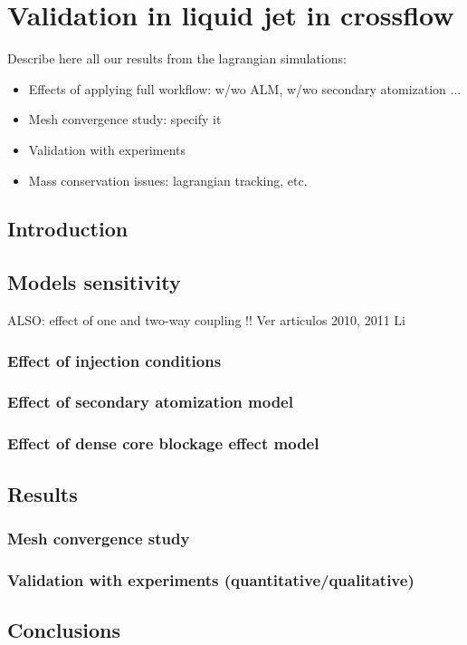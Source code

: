 \chapter{Validation in liquid jet in crossflow}
	\label{ch:jicf_lgs_simulations}


Describe here all our results from the lagrangian simulations:

\begin{itemize}

	\item Effects of applying full workflow: w/wo ALM, w/wo secondary atomization ...
	
	\item Mesh convergence study: specify it
	
	\item Validation with experiments
	
	\item Mass conservation issues: lagrangian tracking, etc. 
	

\end{itemize}

\section{Introduction}

\section{Models sensitivity}

ALSO: effect of one and two-way coupling !! Ver articulos 2010, 2011 Li 

\subsection{Effect of injection conditions}

\subsection{Effect of secondary atomization model}

\subsection{Effect of dense core blockage effect model}

\section{Results}

\subsection{Mesh convergence study}

\subsection{Validation with experiments (quantitative/qualitative)}

\section{Conclusions}